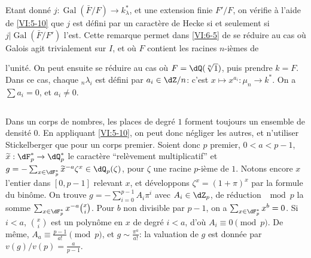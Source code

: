 \documentclass[oneside]{book}
\DeclareMathOperator{\gal}{Gal}
\theoremstyle{sga-source}
\theoremstyle{sga-source-dash}
\theoremstyle{sga-source-dotdash}
\theoremstyle{sga-source-number-note-dash}
\theoremstyle{sga-source-note-number-dotdash}
\theoremstyle{sga-source-example-dotdash}
\theoremstyle{sga-source-inline-number}
\theoremstyle{sga-source-bare-number}
\theoremstyle{sga-source}
\newcommand{\PrintPage}[1]{}\newcommand{\MathPage}[1]{}\newcommand{\PrintCite}[2]{#1}\newcommand{\var}[3]{#1}
\begin{document}
Etant donné $j:\gal(\bar F/F) \to k_\lambda^\ast$, et une extension finie 
$F'/F$, on vérifie à l'aide de \ref{VI:5-10} que $j$ est défini par un 
caractère de Hecke si et seulement si $j|\gal(\bar F/F')$ l'est. Cette 
remarque permet dans \ref{VI:6-5} de se réduire au cas où Galois agit 
trivialement sur $I$, et où $F$ contient les racines $n$-ièmes de 
\PrintPage{216}
l'unité. On peut ensuite se réduire au cas où $F=\dQ(\sqrt[n]{1})$, puis 
prendre $k=F$. Dans ce cas, chaque $_n \lambda_i$ est défini par 
$a_i\in \dZ/n$: c'est $x\mapsto x^{a_i}:\mu_n \to k^\ast$. On a 
$\sum a_i=0$, et $a_i\ne 0$. 





\subsection{}\label{VI:6-7}

Dans un corps de nombres, les places de degré $1$ forment toujours un 
\var{ensemble de densité $0$}{ensemble de densité $1$}{S45-SOL-0908}. En appliquant \ref{VI:5-10}, on peut donc négliger 
les autres, et n'utiliser Stickelberger que pour un corps premier. Soient donc 
$p$ premier, $0<a<p-1$, $\widetilde x:\dF_p^\ast \to \dQ_p^\ast$ le 
caractère ``relèvement multiplicatif'' et 
$g=-\sum_{x\in \dF_p^\ast} \widetilde x^{-a} \zeta^x\in \dQ_p(\zeta)$, pour 
$\zeta$ une racine $p$-ième de $1$. Notons encore $x$ l'entier dans $[0,p-1]$ 
relevant $x$, et développons $\zeta^x=(1+\pi)^x$ par la formule du binôme. 
On trouve $g=-\sum_{i=0}^{p-1} A_i\pi^i$ avec $A_i\in \dZ_p$, de réduction 
$\mod p$ la somme $\sum_{x\in \dF_p^\ast} x^{-a} \binom x i$. Pour $b$ non 
divisible par $p-1$, on a $\sum_{x\in \dF_p^\ast} x^b=0$. Si $i<a$, 
$\binom x i$ est un polynôme en $x$ de degré $i<a$, d'où 
$A_i\equiv 0\pmod p$. De même, $A_a\equiv \frac{p-1}{a!} \pmod p$, et 
$g\sim \frac{\pi^a}{a!}$: la valuation de $g$ est donnée par 
$v(g)/v(p) = \frac{a}{p-1}$. 





\subsection{}\label{VI:6-8}
\end{document}
